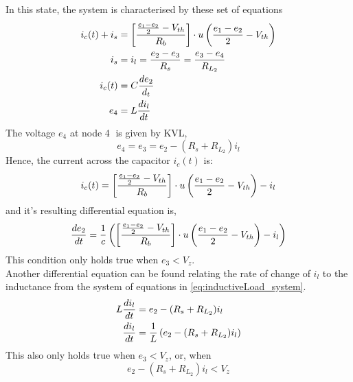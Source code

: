 In this state, the system is characterised by these set of equations
\begin{align}
	i_c(t) + i_s &= \left[\frac{\frac{e_1 - e_2}{2} - V_{th}}{R_b} \right]\cdot u\left(\frac{e_1 - e_2}{2} - V_{th} \right) \\
	i_s &= i_l = \frac{e_2 - e_3}{R_s} = \frac{e_3 - e_4}{R_{L_2}} \\
	i_c(t) &= C \frac{de_2}{d_t} \\
	e_4 &= L\frac{di_l}{dt}
	\label{eq:inductiveLoad_system}
\end{align}
The voltage $e_4$ at node \textcircled{4} is given by KVL,
\begin{equation}
	e_4 = e_3 = e_2 - (R_s + R_{L_2})i_l
\end{equation}
Hence, the current across the capacitor $i_c(t)$ is:
\begin{equation}
	i_c(t) = \left[\frac{\frac{e_1 - e_2}{2} - V_{th}}{R_b} \right]\cdot u\left(\frac{e_1 - e_2}{2} - V_{th} \right) - i_l
\end{equation}
and it's resulting differential equation is,
\begin{equation}
	\frac{de_2}{dt} = \frac{1}{c}\left(\left[\frac{\frac{e_1 - e_2}{2} - V_{th}}{R_b} \right]\cdot u\left(\frac{e_1 - e_2}{2} - V_{th} \right) - i_l \right)
	\label{eq:inductiveLoad_DiffEq1}
\end{equation}
This condition only holds true when $e_3 < V_z$.
\\

Another differential equation can be found relating the rate of change of $i_l$ to the inductance from the system of equations in \eqref{eq:inductiveLoad_system}.
\begin{equation}
	\begin{split}
		L\frac{di_l}{dt} &= e_2 - (R_s + R_{L_2})i_l \\
		 \frac{di_l}{dt} &= \frac{1}{L}\left(e_2 - (R_s + R_{L_2})i_l \right)
	\end{split}
	\label{eq:inductiveLoad_DiffEq2}
\end{equation}
This also only holds true when $e_3 < V_z$, or, when
\begin{equation}
	e_2 - (R_s + R_{L_2})i_l < V_z
\end{equation}

